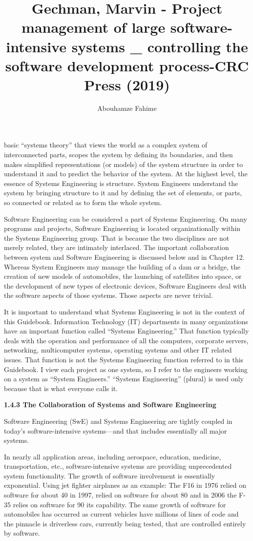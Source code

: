 \documentclass{book}
\title{Gechman, Marvin - Project management of large software-intensive systems _ controlling the software development process-CRC Press (2019)}
\author{Abouhamze Fahime}
\begin{document}
	


\begin{multicols}{2}

basic “systems theory” that views the world as a complex system of interconnected parts, scopes the system by defining
its boundaries, and then makes simplified representations
(or models) of the system structure in order to understand
it and to predict the behavior of the system. At the highest
level, the essence of Systems Engineering is structure. System
Engineers understand the system by bringing structure to it
and by defining the set of elements, or parts, so connected or
related as to form the whole system.

Software Engineering can be considered a part of Systems
Engineering. On many programs and projects, Software
Engineering is located organizationally within the Systems
Engineering group. That is because the two disciplines are
not merely related, they are intimately interlaced. The important collaboration between system and Software Engineering
is discussed below and in Chapter 12. Whereas System
Engineers may manage the building of a dam or a bridge,
the creation of new models of automobiles, the launching
of satellites into space, or the development of new types of
electronic devices, Software Engineers deal with the software
aspects of those systems. Those aspects are never trivial.

It is important to understand what Systems Engineering
is not in the context of this Guidebook. Information
Technology (IT) departments in many organizations have
an important function called “Systems Engineering.” That
function typically deals with the operation and performance
of all the computers, corporate servers, networking, multicomputer systems, operating systems and other IT related
issues. That function is not the Systems Engineering function referred to in this Guidebook. I view each project as
one system, so I refer to the engineers working on a system as
“System Engineers.” “Systems Engineering” (plural) is used
only because that is what everyone calls it.

\textbf{1.4.3 The Collaboration of Systems and Software Engineering}

Software Engineering (SwE) and Systems Engineering
are tightly coupled in today’s software-intensive systems—and that includes essentially all major systems.

In nearly all application areas, including aerospace, education, medicine, transportation, etc., software-intensive systems are providing unprecedented system functionality. The
growth of software involvement is essentially exponential.
Using jet fighter airplanes as an example: The F16 in 1976
relied on software for about 40%
in 1997, relied on software for about 80%
and in 2006 the F-35 relies on software for 90%
its capability. The same growth of software for automobiles
has occurred as current vehicles have millions of lines of code
and the pinnacle is driverless cars, currently being tested,
that are controlled entirely by software.



\end{multicols}
\end{document}
